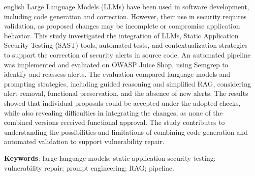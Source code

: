 \begin{resumo}[Abstract]
\begin{otherlanguage*}{english}
Large Language Models (LLMs) have been used in software development, including code generation and correction. However, their use in security requires validation, as proposed changes may be incomplete or compromise application behavior. This study investigated the integration of LLMs, Static Application Security Testing (SAST) tools, automated tests, and contextualization strategies to support the correction of security alerts in source code. An automated pipeline was implemented and evaluated on OWASP Juice Shop, using Semgrep to identify and reassess alerts. The evaluation compared language models and prompting strategies, including guided reasoning and simplified RAG, considering alert removal, functional preservation, and the absence of new alerts. The results showed that individual proposals could be accepted under the adopted checks, while also revealing difficulties in integrating the changes, as none of the combined versions received functional approval. The study contributes to understanding the possibilities and limitations of combining code generation and automated validation to support vulnerability repair.

\textbf{Keywords}: large language models; static application security testing; vulnerability repair; prompt engineering; RAG; pipeline.
\end{otherlanguage*}
\end{resumo}
